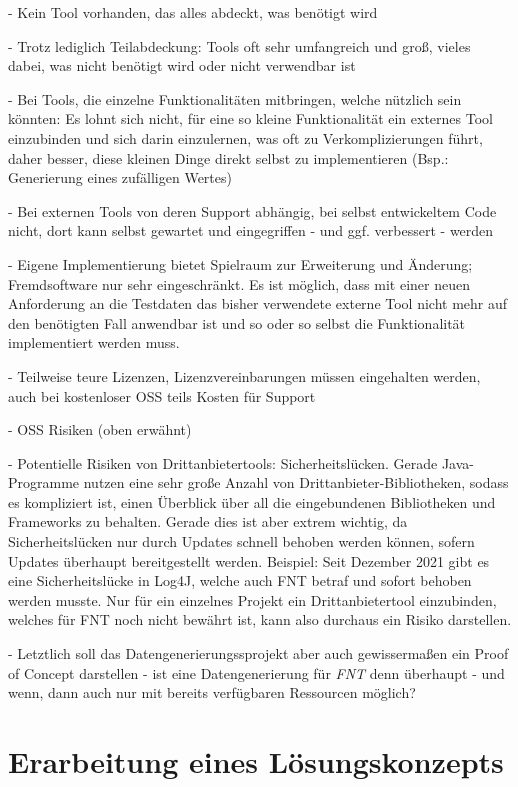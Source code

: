 - Kein Tool vorhanden, das alles abdeckt, was benötigt wird

- Trotz lediglich Teilabdeckung: Tools oft sehr umfangreich und groß, vieles dabei, was nicht benötigt wird oder nicht verwendbar ist

- Bei Tools, die einzelne Funktionalitäten mitbringen, welche nützlich sein könnten: Es lohnt sich nicht, für eine so kleine Funktionalität ein externes Tool einzubinden und sich darin einzulernen, was oft zu Verkomplizierungen führt, daher besser, diese kleinen Dinge direkt selbst zu implementieren (Bsp.: Generierung eines zufälligen Wertes)

- Bei externen Tools von deren Support abhängig, bei selbst entwickeltem Code nicht, dort kann selbst gewartet und eingegriffen - und ggf. verbessert - werden

- Eigene Implementierung bietet Spielraum zur Erweiterung und Änderung; Fremdsoftware nur sehr eingeschränkt. Es ist möglich, dass mit einer neuen Anforderung an die Testdaten das bisher verwendete externe Tool nicht mehr auf den benötigten Fall anwendbar ist und so oder so selbst die Funktionalität implementiert werden muss.

- Teilweise teure Lizenzen, Lizenzvereinbarungen müssen eingehalten werden, auch bei kostenloser \ac{OSS} teils Kosten für Support \cite{singh:2015}\cite{veracode:2021}

- \ac{OSS} Risiken (oben erwähnt)

- Potentielle Risiken von Drittanbietertools: Sicherheitslücken. Gerade Java-Programme nutzen eine sehr große Anzahl von Drittanbieter-Bibliotheken, sodass es kompliziert ist, einen Überblick über all die eingebundenen Bibliotheken und Frameworks zu behalten. Gerade dies ist aber extrem wichtig, da Sicherheitslücken nur durch Updates schnell behoben werden können, sofern Updates überhaupt bereitgestellt werden. \cite{veracode:2021} Beispiel: Seit Dezember 2021 gibt es eine Sicherheitslücke in Log4J, welche auch FNT betraf und sofort behoben werden musste. \cite{mit:2021} Nur für ein einzelnes Projekt ein Drittanbietertool einzubinden, welches für FNT noch nicht bewährt ist, kann also durchaus ein Risiko darstellen.

- Letztlich soll das Datengenerierungssprojekt aber auch gewissermaßen ein Proof of Concept darstellen - ist eine Datengenerierung für \textit{FNT} denn überhaupt - und wenn, dann auch nur mit bereits verfügbaren Ressourcen möglich?

\section{Erarbeitung eines Lösungskonzepts}\label{sec:loesungskonzept}

